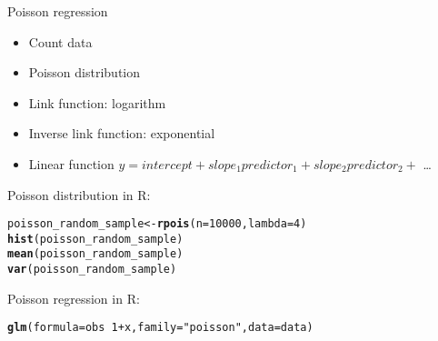 \documentclass[10pt]{beamer}\usepackage[]{graphicx}\usepackage[]{color}
\makeatletter
\newcommand{\hlnum}[1]{\textcolor[rgb]{0.686,0.059,0.569}{#1}}%
\newcommand{\hlstr}[1]{\textcolor[rgb]{0.192,0.494,0.8}{#1}}%
\newcommand{\hlopt}[1]{\textcolor[rgb]{0,0,0}{#1}}%
\newcommand{\hlstd}[1]{\textcolor[rgb]{0.345,0.345,0.345}{#1}}%
\newcommand{\hlkwb}[1]{\textcolor[rgb]{0.69,0.353,0.396}{#1}}%
\newcommand{\hlkwc}[1]{\textcolor[rgb]{0.333,0.667,0.333}{#1}}%
\newcommand{\hlkwd}[1]{\textcolor[rgb]{0.737,0.353,0.396}{\textbf{#1}}}%
\newenvironment{kframe}{%
 \def\at@end@of@kframe{}%
 \ifinner\ifhmode%
  \def\at@end@of@kframe{\end{minipage}}%
  \begin{minipage}{\columnwidth}%
 \fi\fi%
 \def\FrameCommand##1{\hskip\@totalleftmargin \hskip-\fboxsep
 \colorbox{shadecolor}{##1}\hskip-\fboxsep
     \hskip-\linewidth \hskip-\@totalleftmargin \hskip\columnwidth}%
 \MakeFramed {\advance\hsize-\width
   \@totalleftmargin\z@ \linewidth\hsize
   \@setminipage}}%
 {\par\unskip\endMakeFramed%
 \at@end@of@kframe}
\newenvironment{knitrout}{}{} %
\makeatother
\begin{document}
\begin{frame}[fragile]{Poisson regression}
  \begin{itemize}
    \item Count data
    \item Poisson distribution
    \item Link function: logarithm
    \item Inverse link function: exponential
    \item Linear function $y = intercept + slope_1 predictor_1 + slope_2 predictor_2 +$ \dots
  \end{itemize}
  
  \pause
  Poisson distribution in R:
\begin{knitrout}\small
{}\color{fgcolor}\begin{kframe}
\begin{alltt}
  \hlstd{poisson_random_sample} \hlkwb{<-} \hlkwd{rpois}\hlstd{(}\hlkwc{n} \hlstd{=} \hlnum{10000}\hlstd{,} \hlkwc{lambda} \hlstd{=} \hlnum{4}\hlstd{)}
  \hlkwd{hist}\hlstd{(poisson_random_sample)}
  \hlkwd{mean}\hlstd{(poisson_random_sample)}
  \hlkwd{var}\hlstd{(poisson_random_sample)}
\end{alltt}
\end{kframe}
\end{knitrout}
  \pause
  Poisson regression in R:
\begin{knitrout}\small
{}\color{fgcolor}\begin{kframe}
\begin{alltt}
  \hlkwd{glm}\hlstd{(}\hlkwc{formula} \hlstd{= obs} \hlopt{~} \hlnum{1} \hlopt{+} \hlstd{x,} \hlkwc{family} \hlstd{=} \hlstr{"poisson"}\hlstd{,} \hlkwc{data} \hlstd{= data)}
\end{alltt}
\end{kframe}
\end{knitrout}
\end{frame}
\end{document}
